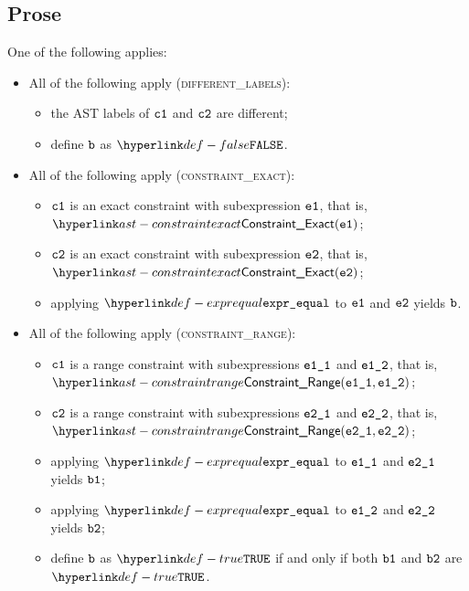 \subsection{Prose}
One of the following applies:
\begin{itemize}
  \item All of the following apply (\textsc{different\_labels}):
  \begin{itemize}
    \item the AST labels of $\texttt{c1}$ and $\texttt{c2}$ are different;
    \item define $\texttt{b}$ as $\False$.
  \end{itemize}

  \item All of the following apply (\textsc{constraint\_exact}):
  \begin{itemize}
    \item $\texttt{c1}$ is an exact constraint with subexpression $\texttt{e1}$, that is, $\ConstraintExact(\veone)$;
    \item $\texttt{c2}$ is an exact constraint with subexpression $\texttt{e2}$, that is, $\ConstraintExact(\vetwo)$;
    \item applying $\exprequal$ to $\texttt{e1}$ and $\texttt{e2}$ yields $\texttt{b}$\ProseOrTypeError.
  \end{itemize}

  \item All of the following apply (\textsc{constraint\_range}):
  \begin{itemize}
    \item $\texttt{c1}$ is a range constraint with subexpressions $\texttt{e1\_1}$ and $\texttt{e1\_2}$, that is, \\ $\ConstraintRange(\veoneone, \veonetwo)$;
    \item $\texttt{c2}$ is a range constraint with subexpressions $\texttt{e2\_1}$ and $\texttt{e2\_2}$, that is, \\ $\ConstraintRange(\vetwoone, \vetwotwo)$;
    \item applying $\exprequal$ to $\texttt{e1\_1}$ and $\texttt{e2\_1}$ yields $\texttt{b1}$\ProseOrTypeError;
    \item applying $\exprequal$ to $\texttt{e1\_2}$ and $\texttt{e2\_2}$ yields $\texttt{b2}$\ProseOrTypeError;
    \item define $\texttt{b}$ as $\True$ if and only if both $\texttt{b1}$ and $\texttt{b2}$ are $\True$.
  \end{itemize}
\end{itemize}

